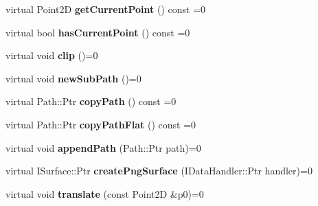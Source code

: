\begin{DoxyCompactItemize}
\item 
\hypertarget{classsambag_1_1disco_1_1_i_draw_context_a666f7394140782077eb236308294cab2}{
virtual Point2D {\bfseries getCurrentPoint} () const =0}
\label{classsambag_1_1disco_1_1_i_draw_context_a666f7394140782077eb236308294cab2}

\item 
\hypertarget{classsambag_1_1disco_1_1_i_draw_context_a7a4254eda37f4b2a7a4cacb5acbd0c1a}{
virtual bool {\bfseries hasCurrentPoint} () const =0}
\label{classsambag_1_1disco_1_1_i_draw_context_a7a4254eda37f4b2a7a4cacb5acbd0c1a}

\item 
\hypertarget{classsambag_1_1disco_1_1_i_draw_context_aaf8942d581da0ae577bfdd5df2b957d5}{
virtual void {\bfseries clip} ()=0}
\label{classsambag_1_1disco_1_1_i_draw_context_aaf8942d581da0ae577bfdd5df2b957d5}

\item 
\hypertarget{classsambag_1_1disco_1_1_i_draw_context_ae37ae14bdcea70b141c832fbd6814502}{
virtual void {\bfseries newSubPath} ()=0}
\label{classsambag_1_1disco_1_1_i_draw_context_ae37ae14bdcea70b141c832fbd6814502}

\item 
\hypertarget{classsambag_1_1disco_1_1_i_draw_context_a16f8014b6b2550e9264569bff8efd5a4}{
virtual Path::Ptr {\bfseries copyPath} () const =0}
\label{classsambag_1_1disco_1_1_i_draw_context_a16f8014b6b2550e9264569bff8efd5a4}

\item 
\hypertarget{classsambag_1_1disco_1_1_i_draw_context_adaec2870d5347aab184e018081de14bc}{
virtual Path::Ptr {\bfseries copyPathFlat} () const =0}
\label{classsambag_1_1disco_1_1_i_draw_context_adaec2870d5347aab184e018081de14bc}

\item 
\hypertarget{classsambag_1_1disco_1_1_i_draw_context_a7267a44eb08728da715a8f4c79d51bdd}{
virtual void {\bfseries appendPath} (Path::Ptr path)=0}
\label{classsambag_1_1disco_1_1_i_draw_context_a7267a44eb08728da715a8f4c79d51bdd}

\item 
\hypertarget{classsambag_1_1disco_1_1_i_draw_context_a41e067b502c91d0dd8eac3bd6e175163}{
virtual ISurface::Ptr {\bfseries createPngSurface} (IDataHandler::Ptr handler)=0}
\label{classsambag_1_1disco_1_1_i_draw_context_a41e067b502c91d0dd8eac3bd6e175163}

\item 
\hypertarget{classsambag_1_1disco_1_1_i_draw_context_a48dfe08aebf5b0de9f01dc1b01e9ad9d}{
virtual void {\bfseries translate} (const Point2D \&p0)=0}
\label{classsambag_1_1disco_1_1_i_draw_context_a48dfe08aebf5b0de9f01dc1b01e9ad9d}


\end{DoxyCompactItemize}
